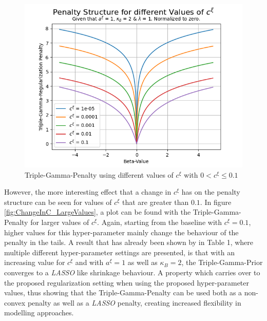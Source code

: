 \documentclass[12pt,a4paper]{article}
\begin{document}
\begin{figure}[!h]
\centering
\includegraphics[scale=0.75]{../02_simulation/021_simulation_figures/TGPenalty_ChangeInC_Part2.png}
\caption{Triple-Gamma-Penalty using different values of $c^\xi$ with $0 < c^\xi \leq 0.1$}
\label{fig:ChangeInC_SmallValues}
\end{figure}

However, the more interesting effect that a change in $c^\xi$ has on the penalty structure can be seen for values of $c^\xi$ that are greater than $0.1$. In figure \ref{fig:ChangeInC_LargeValues}, a plot can be found with the Triple-Gamma-Penalty for larger values of $c^\xi$. Again, starting from the baseline with $c^\xi = 0.1$, higher values for this hyper-parameter mainly change the behaviour of the penalty in the tails. A result that has already been shown by \textcite{TGP2020} in Table 1, where multiple different hyper-parameter settings are presented, is that with an increasing value for $c^\xi$ and with $a^\xi = 1$ as well as $\kappa_B = 2$, the Triple-Gamma-Prior converges to a \textit{LASSO} like shrinkage behaviour. A property which carries over to the proposed regularization setting when using the proposed hyper-parameter values, thus showing that the Triple-Gamma-Penalty can be used both as a non-convex penalty as well as a \textit{LASSO} penalty, creating increased flexibility in modelling approaches. 
\end{document}
